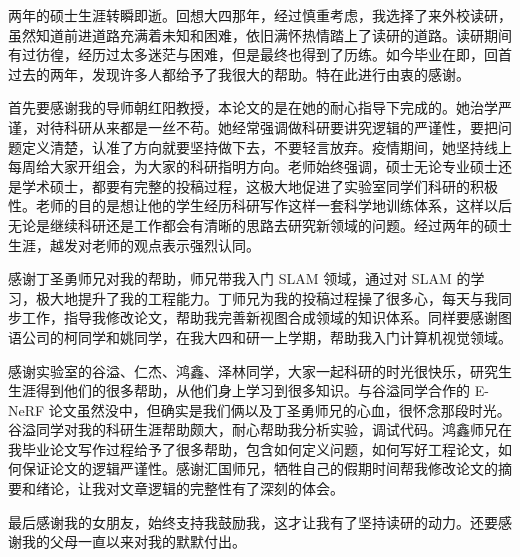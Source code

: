 
\begin{acknowledgements}
  两年的硕士生涯转瞬即逝。回想大四那年，经过慎重考虑，我选择了来外校读研，虽然知道前进道路充满着未知和困难，依旧满怀热情踏上了读研的道路。读研期间有过彷徨，经历过太多迷茫与困难，但是最终也得到了历练。如今毕业在即，回首过去的两年，发现许多人都给予了我很大的帮助。特在此进行由衷的感谢。
  
  首先要感谢我的导师朝红阳教授，本论文的是在她的耐心指导下完成的。她治学严谨，对待科研从来都是一丝不苟。她经常强调做科研要讲究逻辑的严谨性，要把问题定义清楚，认准了方向就要坚持做下去，不要轻言放弃。疫情期间，她坚持线上每周给大家开组会，为大家的科研指明方向。老师始终强调，硕士无论专业硕士还是学术硕士，都要有完整的投稿过程，这极大地促进了实验室同学们科研的积极性。老师的目的是想让他的学生经历科研写作这样一套科学地训练体系，这样以后无论是继续科研还是工作都会有清晰的思路去研究新领域的问题。经过两年的硕士生涯，越发对老师的观点表示强烈认同。
  
  感谢丁圣勇师兄对我的帮助，师兄带我入门 SLAM 领域，通过对 SLAM 的学习，极大地提升了我的工程能力。丁师兄为我的投稿过程操了很多心，每天与我同步工作，指导我修改论文，帮助我完善新视图合成领域的知识体系。同样要感谢图语公司的柯同学和姚同学，在我大四和研一上学期，帮助我入门计算机视觉领域。
  
  感谢实验室的谷溢、仁杰、鸿鑫、泽林同学，大家一起科研的时光很快乐，研究生生涯得到他们的很多帮助，从他们身上学习到很多知识。与谷溢同学合作的 E-NeRF 论文虽然没中，但确实是我们俩以及丁圣勇师兄的心血，很怀念那段时光。谷溢同学对我的科研生涯帮助颇大，耐心帮助我分析实验，调试代码。鸿鑫师兄在我毕业论文写作过程给予了很多帮助，包含如何定义问题，如何写好工程论文，如何保证论文的逻辑严谨性。感谢汇国师兄，牺牲自己的假期时间帮我修改论文的摘要和绪论，让我对文章逻辑的完整性有了深刻的体会。
  
  最后感谢我的女朋友，始终支持我鼓励我，这才让我有了坚持读研的动力。还要感谢我的父母一直以来对我的默默付出。
\end{acknowledgements}
